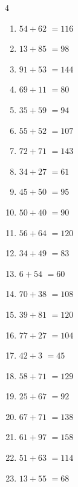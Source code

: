 \begin{multicols}{4}
\begin{enumerate}
  \item $54+62$
        $=116$

  \item $13+85$
        $=98$

  \item $91+53$
        $=144$

  \item $69+11$
        $=80$

  \item $35+59$
        $=94$

  \item $55+52$
        $=107$

  \item $72+71$
        $=143$

  \item $34+27$
        $=61$

  \item $45+50$
        $=95$

  \item $50+40$
        $=90$

  \item $56+64$
        $=120$

  \item $34+49$
        $=83$

  \item $6+54$
        $=60$

  \item $70+38$
        $=108$

  \item $39+81$
        $=120$

  \item $77+27$
        $=104$

  \item $42+3$
        $=45$

  \item $58+71$
        $=129$

\columnbreak %

  \item $25+67$
        $=92$

  \item $67+71$
        $=138$

  \item $61+97$
        $=158$

  \item $51+63$
        $=114$

  \item $13+55$
        $=68$


\end{enumerate}
\end{multicols}
